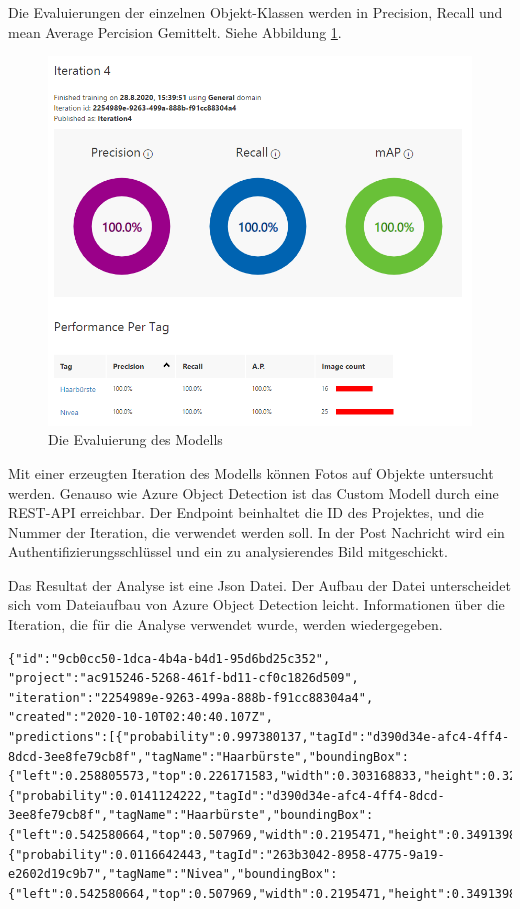 Die Evaluierungen der einzelnen Objekt-Klassen werden in Precision, Recall und mean Average Percision Gemittelt. Siehe Abbildung  \ref{img:trainineval}.

\begin{figure}[H]
	\centering
	\includegraphics[width=1\textwidth]{images/trainingevaluation.png}
	\caption[Evaluierung eines Azure Custom Detection Modells]{Die Evaluierung des Modells}
	\label{img:trainineval}
\end{figure}

Mit einer erzeugten Iteration des Modells können Fotos auf Objekte untersucht werden. Genauso wie Azure Object Detection ist das Custom Modell durch eine REST-API erreichbar. 
Der Endpoint beinhaltet die ID des Projektes, und die Nummer der Iteration, die verwendet werden soll.
In der Post Nachricht wird ein Authentifizierungsschlüssel und ein zu analysierendes Bild mitgeschickt.

Das Resultat der Analyse ist eine Json Datei. 
Der Aufbau der Datei unterscheidet sich vom Dateiaufbau von Azure Object Detection leicht. Informationen über die Iteration, die für die Analyse verwendet wurde, werden wiedergegeben. 

\begin{lstlisting}
{"id":"9cb0cc50-1dca-4b4a-b4d1-95d6bd25c352",
"project":"ac915246-5268-461f-bd11-cf0c1826d509",
"iteration":"2254989e-9263-499a-888b-f91cc88304a4",
"created":"2020-10-10T02:40:40.107Z",
"predictions":[{"probability":0.997380137,"tagId":"d390d34e-afc4-4ff4-8dcd-3ee8fe79cb8f","tagName":"Haarbürste","boundingBox":{"left":0.258805573,"top":0.226171583,"width":0.303168833,"height":0.329167157}},
{"probability":0.0141124222,"tagId":"d390d34e-afc4-4ff4-8dcd-3ee8fe79cb8f","tagName":"Haarbürste","boundingBox":{"left":0.542580664,"top":0.507969,"width":0.2195471,"height":0.3491398}},
{"probability":0.0116642443,"tagId":"263b3042-8958-4775-9a19-e2602d19c9b7","tagName":"Nivea","boundingBox":{"left":0.542580664,"top":0.507969,"width":0.2195471,"height":0.3491398}}]}
\end{lstlisting}

